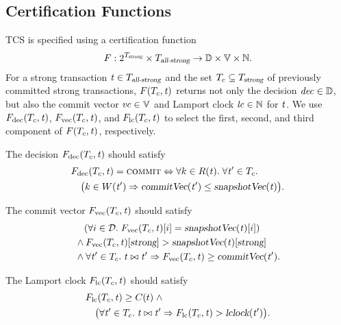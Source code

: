 \subsection{Certification Functions} \label{ss:cert-func}

TCS is specified using a certification function
\begin{align}
  F: 2^{T_{\textsl{strong}}} \times T_{\textsl{all-strong}} \to
    \mathbb{D} \times \mathbb{V} \times \mathbb{N}.
  \label{eqn:f}
\end{align}
For a strong transaction $\mathit{t} \in T_{\textsl{all-strong}}$
and the set $T_{c} \subseteq T_{\textsl{strong}}$ of previously committed strong transactions,
$F(T_{c}, \mathit{t})$ returns not only the decision $\mathit{dec} \in \mathbb{D}$,
but also the commit vector $\mathit{vc} \in \mathbb{V}$
and Lamport clock $\mathit{lc} \in \mathbb{N}$ for $\mathit{t}$.
We use $F_{\rm dec}(T_{c}, \mathit{t})$, $F_{\rm vec}(T_{c}, \mathit{t})$,
and $F_{\rm lc}(T_{c}, \mathit{t})$ to select
the first, second, and third component
of $F(T_{c}, \mathit{t})$, respectively.

The decision $F_{\rm dec}(T_{c}, \mathit{t})$ should satisfy
\begin{align}
  &\fdec(\txsincertify, \tvar) = \commit
    \iff \forall k \in \R(\tvar).\; \forall \tvar' \in \txsincertify.
    \nonumber\\
    &\quad \big(k \in \W(\tvar') \implies
      \commitVC(\tvar') \le \snapshotVC(\tvar)\big).
    \label{eqn:gcf-decision}
\end{align}

The commit vector $F_{\rm vec}(T_{c}, \mathit{t})$ should satisfy
\begin{align}
  &\phantom{\land\;} (\forall i \in \D.\; \fvec(\txsincertify, \tvar)[i] = \snapshotVC(\tvar)[i]) \nonumber\\
  &\land \fvec(\txsincertify, \tvar)[\strongentry] > \snapshotVC(\tvar)[\strongentry] \nonumber\\
  &\land \forall \tvar' \in \txsincertify.\; \tvar \conflict \tvar'
    \implies \fvec(\txsincertify, \tvar) \ge \commitVC(\tvar').
    \label{eqn:gcf-commitvc}
\end{align}

The Lamport clock $F_{\rm lc}(T_{c}, \mathit{t})$ should satisfy
\begin{align}
  &\flc(\txsincertify, \tvar) \ge \lccertify(t) \;\land \nonumber\\
  &\quad \big(\forall \tvar' \in \txsincertify.\; \tvar \conflict \tvar' \implies
    \flc(\txsincertify, \tvar) > \lclock(\tvar')\big).
    \label{eqn:gcf-lc}
\end{align}
